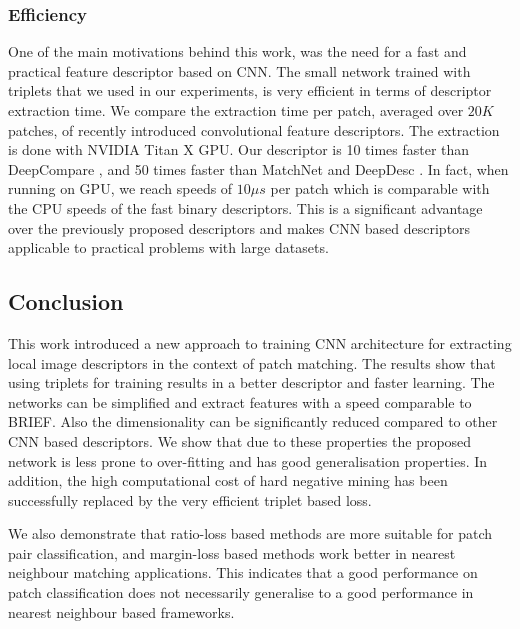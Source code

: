 \subsubsection{Efficiency}
One of the main motivations behind this work, was the need for a fast
and practical feature descriptor based on CNN. The small network trained with triplets
that we used in our experiments, is very
efficient in terms of descriptor extraction time.  We compare the extraction time
 per patch, averaged over $20K$ patches, of  recently
introduced convolutional feature descriptors. The extraction is done with NVIDIA Titan X GPU.
Our descriptor is 10 times faster than
DeepCompare \cite{ZagoruykoCVPR2015}, and 50 times faster than
MatchNet \cite{Han_2015_CVPR} and DeepDesc \cite{simo2015deepdesc}. In fact,
when running on GPU, we reach speeds of ${10\mu s}$ per patch which
is comparable with the CPU speeds of the fast binary
descriptors\cite{Calonder:2010:BBR:1888089.1888148}.  This is a
significant advantage over the previously proposed descriptors and
makes CNN based descriptors applicable to practical problems with
large datasets.

\subsection{Conclusion}
This work introduced a new approach to training CNN architecture for
extracting local image descriptors in the context of patch matching.
The results show that using triplets for training results in a better
descriptor and faster learning. The networks can be simplified and
extract features with a speed comparable to BRIEF.  Also the
dimensionality can be significantly reduced compared to other CNN
based descriptors. We show that due to these properties the proposed
network is less prone to over-fitting and has good generalisation
properties.  In addition, the high computational cost of hard negative
mining has been successfully replaced by the very efficient triplet
based loss.

We also demonstrate that ratio-loss based methods are more suitable
for patch pair classification, and margin-loss based methods work
better in nearest neighbour matching applications.  This indicates
that a good performance on patch classification does not necessarily
generalise to a good performance in nearest neighbour based
frameworks.
